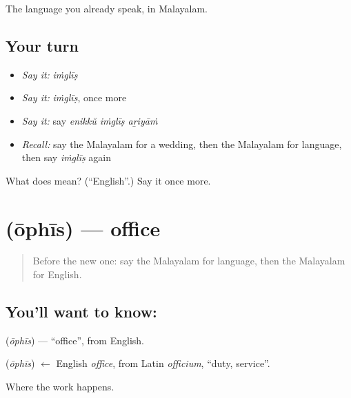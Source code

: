 \begin{grammarlens}[title={What you've built}]
The language you already speak, in Malayalam.
\end{grammarlens}

\subsection*{Your turn}
\begin{itemize}
\raggedright
  \item \emph{Say it:} \emph{iṁglīṣ}
  \item \emph{Say it:} \emph{iṁglīṣ}, once more
  \item \emph{Say it:} say \emph{enikkŭ iṁglīṣ aṟiyāṁ}
  \item \emph{Recall:} say the Malayalam for a wedding, then the Malayalam for language, then say \emph{iṁglīṣ} again
\end{itemize}

\begin{tcolorbox}[breakable,colback=teal!4,colframe=teal!35!black,title={Before you move on}]
What does  mean? (\textquotedblleft{}English\textquotedblright{}.) Say it once more.
\end{tcolorbox}
\section[\texorpdfstring{\ml{ഓഫീസ്} (ōphīs)}{ഓഫീസ് (ōphīs)}]{ (ōphīs) — office}

\label{lesson:ML-C126-office}



\begin{quote}
Before the new one: say the Malayalam for language, then the Malayalam for English.
\end{quote}

\subsection*{You'll want to know: }
\textbf{} (\emph{ōphīs}) — \textquotedblleft{}office\textquotedblright{}, from English.

\begin{cousinweb}
\textbf{} (\emph{ōphīs}) $\leftarrow$ English \emph{office}, from Latin \emph{officium}, \textquotedblleft{}duty, service\textquotedblright{}.
\end{cousinweb}

\begin{grammarlens}[title={What you've built}]
Where the work happens.
\end{grammarlens}

